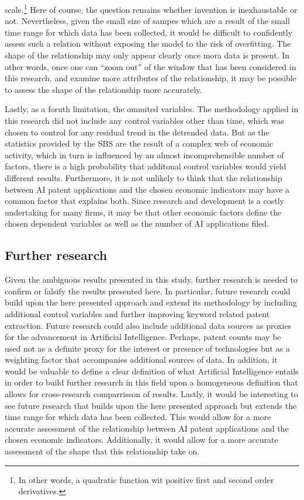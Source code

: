 \documentclass[
  11,
  a4paperpaper,
]{article}
\begin{document}
scale.\footnote{In other words, a quadratic function wit positive first
  and second order derivatives.} Here of course, the question remains
whether invention is inexhaustable or not. Nevertheless, given the small
size of sampes which are a result of the small time range for which data
has been collected, it would be difficult to confidently assess such a
relation without exposing the model to the risk of overfitting. The
shape of the relationship may only appear clearly once mora data is
present. In other words, once one can ``zoom out'' of the window that
has been considered in this research, and examine more attributes of the
relationship, it may be possible to assess the shape of the relationship
more accurately.

Lastly, as a foruth limitation, the ommited variables. The methodology
applied in this research did not include any control variables other
than time, which was chosen to control for any residual trend in the
detrended data. But as the statistics provided by the SBS are the result
of a complex web of economic activity, which in turn is influenced by an
almost incomprehensible number of factors, there is a high probability
that additonal control variables would yield different results.
Furthermore, it is not unlikely to think that the relationship between
AI patent applications and the chosen economic indicators may have a
common factor that explains both. Since research and development is a
costly undertaking for many firms, it may be that other economic factors
define the chosen dependent variables as well as the number of AI
applications filed.

\subsection{Further research}\label{further-research}

Given the ambiguous results presented in this study, further research is
needed to confirm or falsify the results presented here. In particular,
future research could build upon the here presented approach and extend
its methodology by including additional control variables and further
improving keyword related patent extraction. Future research could also
include additional data sources as proxies for the advancement in
Artificial Intelligence. Perhaps, patent counts may be used not as a
definite proxy for the interest or presence of technologies but as a
weighting factor that accompanies additional sources of data. In
addition, it would be valuable to define a clear definition of what
Artificial Intelligence entails in order to build further research in
this field upon a homogeneous definition that allows for cross-research
comparrisson of results. Lastly, it would be interesting to see future
research that builds upon the here presented approach but extends the
time range for which data has been collected. This would allow for a
more accurate assessment of the relationship between AI patent
applications and the chosen economic indicators. Additionally, it would
allow for a more accurate assessment of the shape that this relationship
take on.
\end{document}
